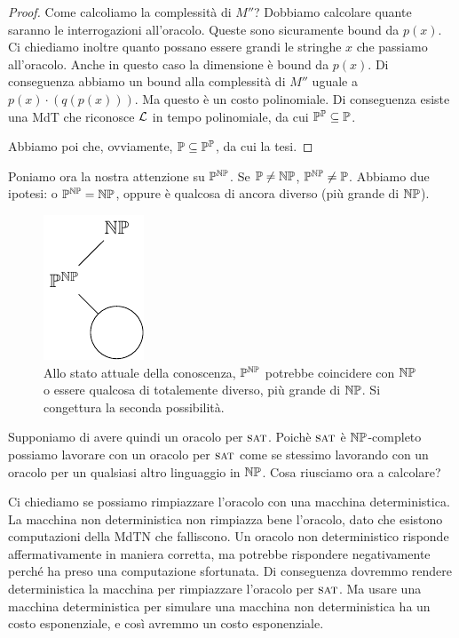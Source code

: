 \begin{proof}
    Come calcoliamo la complessità di $M''$? Dobbiamo calcolare quante saranno le interrogazioni
    all'oracolo. Queste sono sicuramente bound da $p(x)$. Ci chiediamo inoltre quanto possano essere
    grandi le stringhe $x$ che passiamo all'oracolo. Anche in questo caso la dimensione è bound da
    $p(x)$. Di conseguenza abbiamo un bound alla complessità di $M''$ uguale a
    $p(x)\cdot(q(p(x)))$. Ma questo è un costo polinomiale. Di conseguenza esiste una MdT che
    riconosce $\mathcal{L}$ in tempo polinomiale, da cui $\mathbb{P}^{\mathbb{P}} \subseteq \mathbb{P}$.

    Abbiamo poi che, ovviamente, $\mathbb{P} \subseteq \mathbb{P}^{\mathbb{P}}$, da cui la tesi.
\end{proof}

Poniamo ora la nostra attenzione su $\mathbb{P}^{\mathbb{NP}}$. Se $\mathbb{P} \not= \mathbb{NP}$,
$\mathbb{P}^{\mathbb{NP}} \not= \mathbb{P}$. Abbiamo due ipotesi: o $\mathbb{P}^{\mathbb{NP}} = \mathbb{NP}$, oppure
è qualcosa di ancora diverso (più grande di $\mathbb{NP}$).

\begin{figure}[h]
    \begin{center}
        \includegraphics{./img/oracles/PNP.pdf}
        \caption{Allo stato attuale della conoscenza, $\mathbb{P}^{\mathbb{NP}}$ potrebbe coincidere con
        $\mathbb{NP}$ o essere qualcosa di totalemente diverso, più grande di $\mathbb{NP}$. Si
    congettura la seconda possibilità.}
    \end{center}
\end{figure}

Supponiamo di avere quindi un oracolo per $\textsc{sat}$. Poichè $\textsc{sat}$ è $\mathbb{NP}$-completo possiamo
lavorare con un oracolo per $\textsc{sat}$ come se stessimo lavorando con un oracolo per un qualsiasi altro
linguaggio in $\mathbb{NP}$. Cosa riusciamo ora a calcolare? 

Ci chiediamo se possiamo rimpiazzare l'oracolo con una macchina deterministica. La macchina non
deterministica non rimpiazza bene l'oracolo, dato che esistono computazioni della MdTN che
falliscono. Un oracolo non deterministico risponde affermativamente in maniera corretta, ma potrebbe
rispondere negativamente perché ha preso una computazione sfortunata. Di conseguenza dovremmo
rendere deterministica la macchina per rimpiazzare l'oracolo per $\textsc{sat}$. Ma usare una macchina
deterministica per simulare una macchina non deterministica ha un costo esponenziale, e così
avremmo un costo esponenziale.

